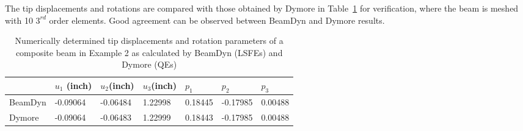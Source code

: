 The tip displacements and rotations are compared with those obtained by Dymore in Table~\ref{E2Tip} for verification, where the beam is meshed with 10 $3^{rd}$ order elements. Good agreement can be observed between BeamDyn and Dymore results.
\begin{table}[tbp]
\centering 
\caption{Numerically determined tip displacements and rotation parameters of
a composite beam in Example 2 as calculated by BeamDyn (LSFEs) and Dymore
(QEs) }
\label{E2Tip} 
	\begin{tabular}{| l | l | l | l | l | l | l |}
    	\hline
    	 & $u_1$ (inch)& $u_2$(inch) & $u_3$(inch)  & $p_1$ & $p_2$ & $p_3$  \\ 
	 \hline
	 BeamDyn & -0.09064 & -0.06484 & 1.22998 & 0.18445 & -0.17985 & 0.00488 \\
	 \hline
	 Dymore & -0.09064 & -0.06483 & 1.22999 & 0.18443 & -0.17985 & 0.00488 \\
    	\hline
    \end{tabular}
\end{table}

